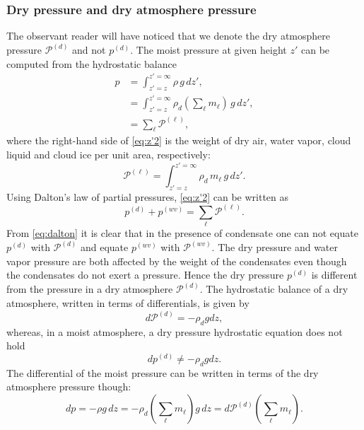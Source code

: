 \documentclass{agujournal}
\begin{document}
\subsubsection{Dry pressure and dry atmosphere pressure}
The observant reader will have noticed that we denote the dry atmosphere pressure $\mathcal{P}^{(d)}$ and not $p^{(d)}$. The moist pressure at given height $z'$ can be computed from the hydrostatic balance
\begin{align}
p&=\int^{z'=\infty}_{z'=z}\rho\, g\, dz',\\
 &=\int^{z'=\infty}_{z'=z}\rho_d \left( \sum_\ell m_\ell \right)\, g\, dz',\\
 &=\sum_\ell \mathcal{P}^{(\ell)},\label{eq:z'2}
\end{align}
where the right-hand side of \eqref{eq:z'2} is the weight of dry air, water vapor, cloud liquid and cloud ice per unit area, respectively:
\begin{equation}
{\mathcal{P}}^{(\ell)}=\int^{z'=\infty}_{z'=z}\rho_d \, m_\ell \, g\, dz'\label{eq:z'}.
\end{equation}
Using Dalton's law of partial pressures, \eqref{eq:z'2} can be written as
\begin{equation}
p^{(d)}+p^{(wv)}=\sum_\ell {\mathcal{P}}^{(\ell)}.\label{eq:dalton}
\end{equation}
From \eqref{eq:dalton} it is clear that in the presence of condensate one can not equate $p^{(d)}$ with ${\mathcal{P}}^{(d)}$ and equate $p^{(wv)}$ with ${\mathcal{P}}^{(wv)}$. The dry pressure and water vapor pressure are both affected by the weight of the condensates even though the condensates do not exert a pressure. Hence the dry pressure $p^{(d)}$ is different from the pressure in a dry atmosphere $\mathcal{P}^{(d)}$. The hydrostatic balance of a dry atmosphere, written in terms of differentials, is given by
\begin{equation}
d\mathcal{P}^{(d)}=-\rho_d g dz,\label{eq:dry_atm_hydro}
\end{equation}
whereas, in a moist atmosphere, a dry pressure hydrostatic equation does not hold
\begin{equation}
dp^{(d)}\ne -\rho_d g dz.
\end{equation}
The differential of the moist pressure can be written in terms of the dry atmosphere pressure though:
\begin{equation}
dp=-\rho g \, dz = -\rho_d \left( \sum_\ell m_\ell\right)g\, dz = d\mathcal{P}^{(d)}\left( \sum_\ell m_\ell\right).
\end{equation}
\end{document}
